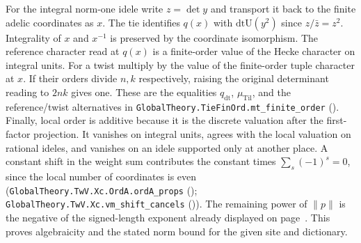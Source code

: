 For the integral norm-one idele write $z=\det y$ and transport it back to the finite adelic coordinates as $x$. The tie identifies $q(x)$ with $\mathrm{dtU}(y^2)$ since $z/\bar z=z^2$. Integrality of $x$ and $x^{-1}$ is preserved by the coordinate isomorphism. The reference character read at $q(x)$ is a finite-order value of the Hecke character on integral units. For a twist multiply by the value of the finite-order tuple character at $x$. If their orders divide $n,k$ respectively, raising the original determinant reading to $2nk$ gives one. These are the equalities $q_{\mathrm{dt}}$, $\mu_{\mathrm{Til}}$, and the reference/twist alternatives in \nolinkurl{GlobalTheory.TieFinOrd.mt_finite_order} (). Finally, local order is additive because it is the discrete valuation after the first-factor projection. It vanishes on integral units, agrees with the local valuation on rational ideles, and vanishes on an idele supported only at another place. A constant shift in the weight sum contributes the constant times $\sum_s(-1)^s=0$, since the local number of coordinates is even (\nolinkurl{GlobalTheory.TwV.Xc.OrdA.ordA_props} (); \nolinkurl{GlobalTheory.TwV.Xc.vm_shift_cancels} ()). The remaining power of $\lVert p\rVert$ is the negative of the signed-length exponent already displayed on page~\pageref{r6:Z4.2.08}. This proves algebraicity and the stated norm bound for the given site and dictionary.

